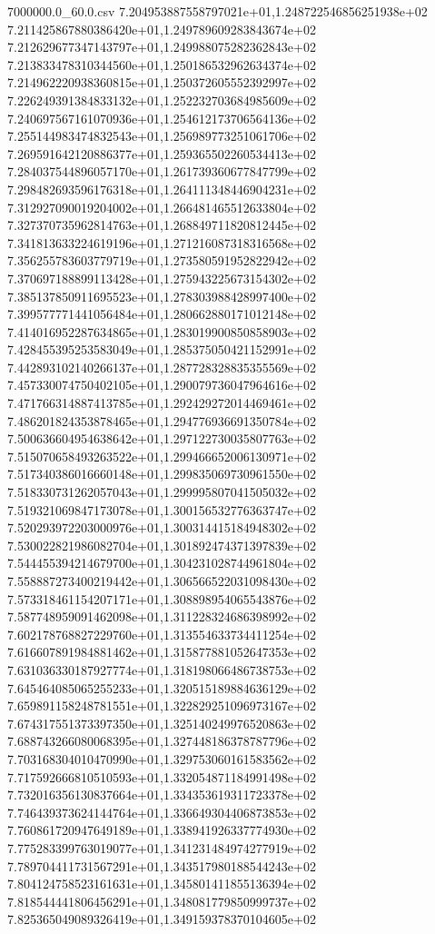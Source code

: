 \begin{filecontents*}{7000000.0_60.0.csv}
7.204953887558797021e+01,1.248722546856251938e+02
7.211425867880386420e+01,1.249789609283843674e+02
7.212629677347143797e+01,1.249988075282362843e+02
7.213833478310344560e+01,1.250186532962634374e+02
7.214962220938360815e+01,1.250372605552392997e+02
7.226249391384833132e+01,1.252232703684985609e+02
7.240697567161070936e+01,1.254612173706564136e+02
7.255144983474832543e+01,1.256989773251061706e+02
7.269591642120886377e+01,1.259365502260534413e+02
7.284037544896057170e+01,1.261739360677847799e+02
7.298482693596176318e+01,1.264111348446904231e+02
7.312927090019204002e+01,1.266481465512633804e+02
7.327370735962814763e+01,1.268849711820812445e+02
7.341813633224619196e+01,1.271216087318316568e+02
7.356255783603779719e+01,1.273580591952822942e+02
7.370697188899113428e+01,1.275943225673154302e+02
7.385137850911695523e+01,1.278303988428997400e+02
7.399577771441056484e+01,1.280662880171012148e+02
7.414016952287634865e+01,1.283019900850858903e+02
7.428455395253583049e+01,1.285375050421152991e+02
7.442893102140266137e+01,1.287728328835355569e+02
7.457330074750402105e+01,1.290079736047964616e+02
7.471766314887413785e+01,1.292429272014469461e+02
7.486201824353878465e+01,1.294776936691350784e+02
7.500636604954638642e+01,1.297122730035807763e+02
7.515070658493263522e+01,1.299466652006130971e+02
7.517340386016660148e+01,1.299835069730961550e+02
7.518330731262057043e+01,1.299995807041505032e+02
7.519321069847173078e+01,1.300156532776363747e+02
7.520293972203000976e+01,1.300314415184948302e+02
7.530022821986082704e+01,1.301892474371397839e+02
7.544455394214679700e+01,1.304231028744961804e+02
7.558887273400219442e+01,1.306566522031098430e+02
7.573318461154207171e+01,1.308898954065543876e+02
7.587748959091462098e+01,1.311228324686398992e+02
7.602178768827229760e+01,1.313554633734411254e+02
7.616607891984881462e+01,1.315877881052647353e+02
7.631036330187927774e+01,1.318198066486738753e+02
7.645464085065255233e+01,1.320515189884636129e+02
7.659891158248781551e+01,1.322829251096973167e+02
7.674317551373397350e+01,1.325140249976520863e+02
7.688743266080068395e+01,1.327448186378787796e+02
7.703168304010470990e+01,1.329753060161583562e+02
7.717592666810510593e+01,1.332054871184991498e+02
7.732016356130837664e+01,1.334353619311723378e+02
7.746439373624144764e+01,1.336649304406873853e+02
7.760861720947649189e+01,1.338941926337774930e+02
7.775283399763019077e+01,1.341231484974277919e+02
7.789704411731567291e+01,1.343517980188544243e+02
7.804124758523161631e+01,1.345801411855136394e+02
7.818544441806456291e+01,1.348081779850999737e+02
7.825365049089326419e+01,1.349159378370104605e+02

\end{filecontents*}
